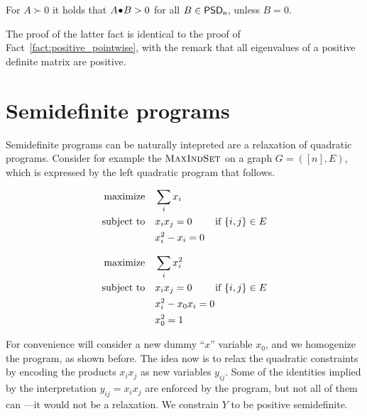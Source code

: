 \documentclass[a4paper,twoside,justified]{tufte-handout}
\begin{document}
\begin{fact}\label{fact:strict_positive_pointwise}
  For $ A \succ 0 $ it holds that $ {A}\!\bullet\!{B}>0 $ for all $
  B \in \mathsf{PSD_{n}} $, unless $ B=0 $.
\end{fact}
The proof of the latter fact is identical to the proof of
Fact~\ref{fact:positive_pointwise}, with the remark that all
eigenvalues of a positive definite matrix are positive.


\section{Semidefinite programs}

Semidefinite programs can be naturally intepreted are a relaxation of
quadratic programs. Consider for example the $
\textsc{MaxIndSet} $ on a graph $ G=([n],E) $, which is
expressed by the left quadratic program that follows.

\begin{figure*}
\begin{minipage}[t]{0.5\textwidth}
\begin{alignat}{2}
  \maximize \sum_{i}x_{i} \notag\\
  \subjectto x_{i}x_{j} =0 \qquad \text{\ if $\{i,j\}\in E$} \label{eq:maxindset1}\\
  & x^{2}_{i} -x_{i}= 0 \notag
\end{alignat}
\end{minipage}
\begin{minipage}[t]{0.5\textwidth}
\begin{alignat}{2}
  \maximize \sum_{i}x^{2}_{i} \notag\\
  \subjectto x_{i}x_{j} =0 \qquad \text{\ if $\{i,j\}\in E$} \label{eq:maxindset2}\\
  & x^{2}_{i} -x_{0}x_{i} =0 \notag\\
  & x^{2}_{0} = 1 \notag
\end{alignat}
\end{minipage}
\end{figure*}


For convenience will consider a new dummy ``$x$'' variable $ x_{0} $,
and we homogenize the program, as shown before. 
%
The idea now is to relax the quadratic constraints by encoding the
products $x_{i}x_{j} $ as new variables $ y_{ij} $. Some of the
identities implied by the interpretation $ y_{ij} = x_{i}x_{j} $ are
enforced by the program, but not all of them can ---it would not be a
relaxation. We constrain $Y$ to be positive semidefinite.
%
\end{document}
